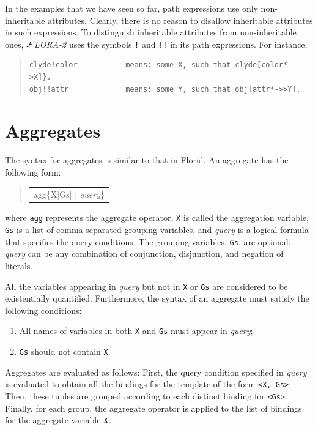 \documentclass[11pt]{article}
\newenvironment{qrules}{\begin{quote}\tt\begin{tabular}[t]{l}}%
{\end{tabular}\end{quote}}
\newcommand{\FLORA}{{\mbox{${\cal F}${\small\it LORA}\rm\emph{-2}}}\xspace}
\newcommand{\FLORID}{{\mbox{\sc Florid}}\xspace}
\begin{document}
In the examples that we have seen so far, path expressions use only
non-inheritable attributes. Clearly, there is no reason to disallow
inheritable attributes in such expressions. To distinguish inheritable
attributes from non-inheritable ones, \FLORA uses the symbols
{\tt !} and {\tt !!} in its path expressions. For instance,
\begin{quote}
\begin{verbatim}
clyde!color           means: some X, such that clyde[color*->X]}.
obj!!attr             means: some Y, such that obj[attr*->>Y].
\end{verbatim}
\end{quote}



\section{Aggregates}


The syntax for aggregates is similar to that in \FLORID. An
aggregate has the following form:
\begin{qrules}
agg\{X[Gs] $|$ {\it query}\}
\end{qrules}
%
where {\tt agg} represents the aggregate operator, {\tt X} is called the
aggregation variable, {\tt Gs} is a list of comma-separated grouping
variables, and {\it query} is a logical formula that specifies the
query conditions. The grouping variables, {\tt Gs}, are optional. {\it query}
can be any combination of conjunction, disjunction, and negation of literals.

All the variables appearing in {\it query} but not in {\tt X} or {\tt Gs} are
considered to be existentially quantified. Furthermore, the syntax of an
aggregate must satisfy the following conditions:
\begin{enumerate}
\item All names of variables in both {\tt X} and {\tt Gs} must
appear in {\it query};
\item {\tt Gs} should not contain {\tt X}.
\end{enumerate}

Aggregates are evaluated as follows: First, the query
condition specified in {\it query} is evaluated to obtain all the bindings
for the template of the form {\tt \texttt{<}X, Gs\texttt{>}}. Then, these
tuples are grouped according to each distinct binding for
{\tt \texttt{<}Gs\texttt{>}}. Finally, for each group, the aggregate operator
is applied to the list of bindings for the aggregate variable $\tt X$.
\end{document}
